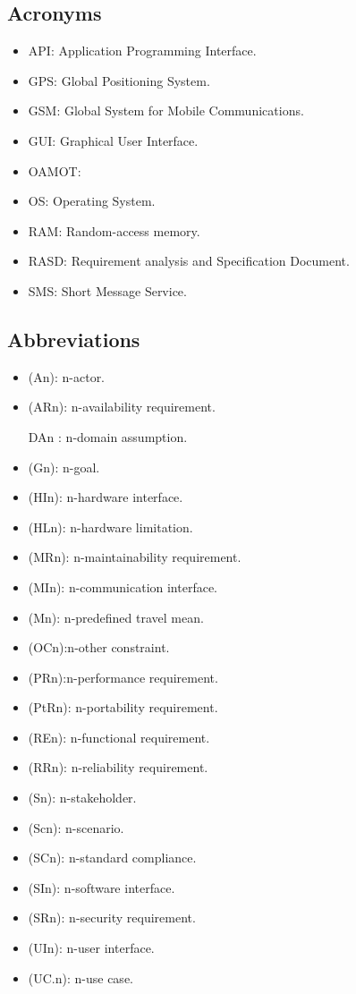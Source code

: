 \documentclass[a4paper,leqno]{book}
\begin{document}
\subsection{Acronyms}
\begin{itemize}
	\item API: Application Programming Interface.
	\item GPS: Global Positioning System.
	\item GSM: Global System for Mobile Communications.
	\item GUI: Graphical User Interface.
	\item OAMOT:
	\item OS: Operating System.
	\item RAM: Random-access memory.
	\item RASD: Requirement analysis and Specification Document.
	\item SMS: Short Message Service.
\end{itemize}


\subsection{Abbreviations}
\begin{itemize}
	\item (An): n-actor.
	\item (ARn): n-availability requirement.
	\item [DAn]: n-domain assumption.
	\item (Gn): n-goal.
	\item (HIn): n-hardware interface.
	\item (HLn): n-hardware limitation.
	\item (MRn): n-maintainability requirement.
	\item (MIn): n-communication interface.
	\item (Mn): n-predefined travel mean.
	\item (OCn):n-other constraint.
	\item (PRn):n-performance requirement.
	\item (PtRn): n-portability requirement.
	\item (REn): n-functional requirement.
	\item (RRn): n-reliability requirement.
	\item (Sn): n-stakeholder.
	\item (Scn): n-scenario.
	\item (SCn): n-standard compliance.
	\item (SIn): n-software interface.
	\item (SRn): n-security requirement.
	\item (UIn): n-user interface.
	\item (UC.n): n-use case.
	
\end{itemize}
\end{document}
